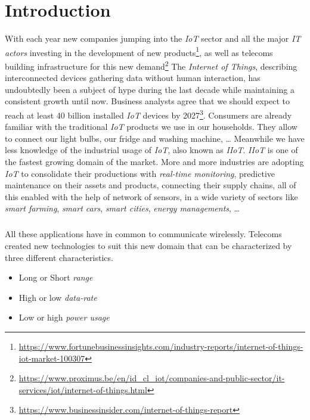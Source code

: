 \chapter{Introduction}

With each year new companies jumping into the \emph{IoT} sector and all the
major \emph{IT actors} investing in the development of new
products\footnote{\url{https://www.fortunebusinessinsights.com/industry-reports/internet-of-things-iot-market-100307}},
as well as telecoms building infrastructure for this new 
demand\footnote{\url{https://www.proximus.be/en/id_cl_iot/companies-and-public-sector/it-services/iot/internet-of-things.html}}
The \emph{Internet of Things}, describing interconnected devices gathering
data without human interaction, has undoubtedly been a subject of hype during the
last decade while maintaining a consistent growth until now.
Business analysts agree that we should expect to reach at least 40 billion
installed \emph{IoT} devices by
2027\footnote{\url{https://www.businessinsider.com/internet-of-things-report}}. 
Consumers are already familiar with the traditional \emph{IoT} products
we use in our households. They allow to connect our light bulbs, our fridge and
washing machine, \ldots
Meanwhile we have less knowledge of the industrial usage of \emph{IoT}, also
known as \emph{IIoT}. \emph{IIoT} is one of the fastest growing domain of the
market. More and more industries are adopting \emph{IoT}  to consolidate their
productions with \emph{real-time monitoring}, predictive maintenance on their
assets and products, connecting their supply chains, all of this enabled with
the help of network of sensors, in a wide variety of
sectors like \emph{smart farming}, \emph{smart cars}, \emph{smart cities},
\emph{energy managements}, \ldots

\paragraph{}

All these applications have in common to communicate wirelessly.
Telecoms created new technologies to suit this new domain that can be
characterized by three different characteristics.

\begin{itemize}
    \item Long or Short \emph{range}
    \item High or low \emph{data-rate}
    \item Low or high \emph{power usage} 
\end{itemize}

